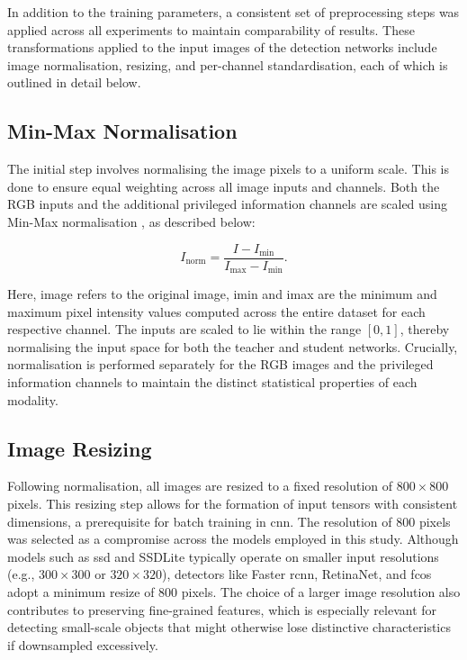 In addition to the training parameters, a consistent set of preprocessing steps was applied across all experiments to maintain comparability of results. These transformations applied to the input images of the detection networks include image normalisation, resizing, and per-channel standardisation, each of which is outlined in detail below.

\subsection{Min-Max Normalisation}
\label{subsec:4_normalisation}

The initial step involves normalising the image pixels to a uniform scale. This is done to ensure equal weighting across all image inputs and channels. Both the RGB inputs and the additional privileged information channels are scaled using Min-Max normalisation \cite{min_max_normalisation}, as described below:

\begin{equation} \label{eq:min_max}
I_{\text{norm}} = \frac{I - I_{\text{min}}}{I_{\text{max}} - I_{\text{min}}} .
\end{equation}

\noindent Here, \gls{image} refers to the original image, \gls{imin} and \gls{imax} are the minimum and maximum pixel intensity values computed across the entire dataset for each respective channel. The inputs are scaled to lie within the range $[0, 1]$, thereby normalising the input space for both the teacher and student networks. Crucially, normalisation is performed separately for the RGB images and the privileged information channels to maintain the distinct statistical properties of each modality. 

\subsection{Image Resizing}
\label{subsec:4_resizing}

Following normalisation, all images are resized to a fixed resolution of $800 \times 800$ pixels. This resizing step allows for the formation of input tensors with consistent dimensions, a prerequisite for batch training in \gls{cnn}. The resolution of $800$ pixels was selected as a compromise across the models employed in this study.
Although models such as \gls{ssd} and SSDLite typically operate on smaller input resolutions (e.g., $300 \times 300$ or $320 \times 320$), detectors like Faster \gls{rcnn}, RetinaNet, and \gls{fcos} adopt a minimum resize of $800$ pixels. The choice of a larger image resolution also contributes to preserving fine-grained features, which is especially relevant for detecting small-scale objects that might otherwise lose distinctive characteristics if downsampled excessively.


